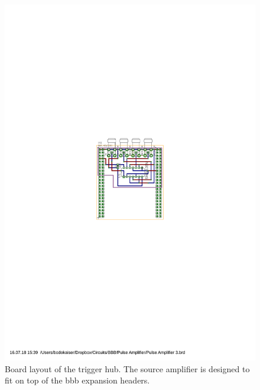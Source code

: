 \begin{figure}[h]
  \centering
  \begin{minipage}{.40\textwidth}
    \centering
    \includegraphics[width=\linewidth]{images/circuits/line-driver/layout.pdf}
    \captionsetup{width=\linewidth}
    \caption{Board layout of the trigger hub. The source amplifier is designed
to fit on top of the \gls{bbb} expansion headers.}
  \end{minipage}
  \begin{minipage}{.50\textwidth}
    \centering

\end{minipage}
\end{figure}

